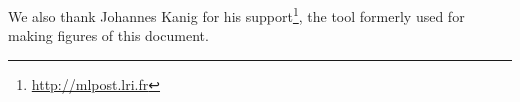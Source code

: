 \documentclass[svgnames]{frama-c-book}
\begin{document}
\insertpeople

We also thank Johannes Kanig for his 
support\footnote{\url{http://mlpost.lri.fr}}, the tool formerly used for
making figures of this document.

\medskip










\appendix




\cleardoublepage
{}
{}




\cleardoublepage
{}
{}
\listoffigures


\cleardoublepage
{}
{}
\printindex

\end{document}
